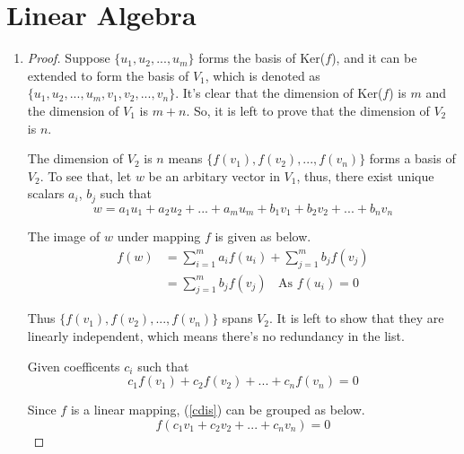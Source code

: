 \documentclass[paper=a4, fontsize=11pt]{scrartcl} %
\numberwithin{equation}{section} %
\numberwithin{figure}{section} %
\numberwithin{table}{section} %
\begin{document}

\section{Linear Algebra}

\begin{enumerate}
	\item
		\begin{proof}
			Suppose $\{u_1, u_2, ... , u_m \}$ forms the basis of Ker($f$), and it can be extended to form the basis of $V_1$, which is denoted as $\{u_1, u_2, ... , u_m, v_1, v_2, ... , v_n \}$. It's clear that the dimension of Ker($f$) is $m$ and the dimension of $V_1$ is $m+n$. So, it is left to prove that the dimension of $V_2$ is $n$.
			
			The dimension of $V_2$ is $n$ means $\{f(v_1), f(v_2), ... , f(v_n)\}$ forms a basis of $V_2$. To see that, let $w$ be an arbitary vector in $V_1$, thus, there exist unique scalars $a_i$, $b_j$ such that 
			\begin{equation}
				w = a_1 u_1 + a_2 u_2 + ... + a_m u_m + b_1 v_1 + b_2 v_2 + ... + b_n v_n
			\end{equation}
			
			The image of $w$ under mapping $f$ is given as below.
			\begin{equation}
				\begin{aligned}
					f(w) & = \sum_{i=1}^{m}a_i f(u_i) + \sum_{j=1}^{m}b_j f(v_j) \\
						 & = \sum_{j=1}^{m}b_j f(v_j)  \ \ \ \  \text{As $f(u_i) = 0$}
				\end{aligned}
			\end{equation}
			
			Thus $\{f(v_1), f(v_2), ... , f(v_n)\}$ spans $V_2$. It is left to show that they are linearly independent, which means there's no redundancy in the list.
			
			Given coefficents $c_i$ such that
			\begin{equation}
				c_1 f(v_1) + c_2 f(v_2) + ... + c_n f(v_n) = 0 \label{cdis}
			\end{equation}
			
			Since $f$ is a linear mapping, (\ref{cdis}) can be grouped as below.
			\begin{equation}
				f(c_1 v_1 + c_2 v_2 + ... + c_n v_n) = 0
			\end{equation}
			

\end{proof}
\end{enumerate}
\end{document}
